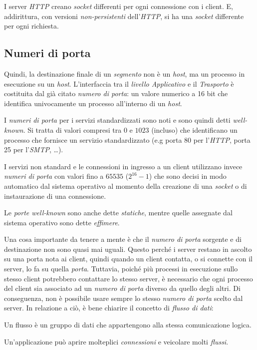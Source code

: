 \begin{note}
    I server \emph{HTTP} creano \emph{socket} differenti per ogni connessione con
    i client. E, addirittura, con versioni \emph{non-persistenti} dell'\emph{HTTP},
    si ha una \emph{socket} differente per ogni richiesta.
\end{note}

\subsection{Numeri di porta}
Quindi, la destinazione finale di un \emph{segmento} non è un \emph{host}, ma un processo
in esecuzione su un \emph{host}. L'interfaccia tra il \emph{livello Applicativo} e il
\emph{Trasporto} è costituita dal già citato \emph{numero di porta}: un valore
numerico a 16 bit che identifica univocamente un processo all'interno di un
\emph{host}.

I \emph{numeri di porta} per i servizi standardizzati sono noti e sono quindi detti
\emph{well-known}. Si tratta di valori compresi tra $0$ e $1023$ (incluso) che
identificano un processo che fornisce un servizio standardizzato (e.g porta 80
per l'\emph{HTTP}, porta 25 per l'\emph{SMTP}, \dots).

\noindent
I servizi non standard e le connessioni in ingresso a un client utilizzano invece
\emph{numeri di porta} con valori fino a $65535$ ($2^{16}-1$) che sono decisi in
modo automatico dal sistema operativo al momento della creazione di una
\emph{socket} o di instaurazione di una connessione.

\begin{note}
    Le \emph{porte well-known} sono anche dette \emph{statiche}, mentre quelle
    assegnate dal sistema operativo sono dette \emph{effimere}.
\end{note}\noindent
Una cosa importante da tenere a mente è che il \emph{numero di porta} sorgente e
di destinazione non sono quasi mai uguali.
Questo perché i server restano in ascolto su una porta nota ai client, quindi
quando un client contatta, o si connette con il server, lo fa su quella
\emph{porta}. Tuttavia, poiché più processi in esecuzione sullo stesso client
potrebbero contattare lo stesso server, è necessario che ogni processo del
client sia associato ad un \emph{numero di porta} diverso da quello degli altri.
Di conseguenza, non è possibile usare sempre lo stesso \emph{numero di porta}
scelto dal server. In relazione a ciò, è bene chiarire il concetto di
\emph{flusso di dati}:
\begin{definition}
    Un flusso è un gruppo di dati che appartengono alla stessa comunicazione
    logica.
\end{definition}
\begin{note}
    Un'applicazione può aprire molteplici \emph{connessioni} e veicolare
    molti \emph{flussi}.
\end{note}

